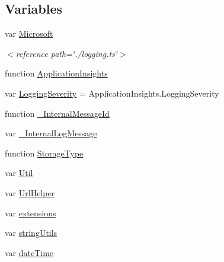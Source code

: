 \subsection*{Variables}
\begin{DoxyCompactItemize}
\item 
var \hyperlink{obj_2_release_2_package_2_package_tmp_2_scripts_2ai_80_822_89-build00167_8js_af7b21097393c8dc2ece8949358ff0e27}{Microsoft}
\begin{DoxyCompactList}\small\item\em $<$reference path=\char`\"{}./logging.\+ts\char`\"{}$>$ \end{DoxyCompactList}\item 
function \hyperlink{obj_2_release_2_package_2_package_tmp_2_scripts_2ai_80_822_89-build00167_8js_aa415ef4f8cdd699689ef4b61db7656d8}{Application\+Insights}
\item 
var \hyperlink{obj_2_release_2_package_2_package_tmp_2_scripts_2ai_80_822_89-build00167_8js_a7c9dc87e469261dd3cdf56090107bebc}{Logging\+Severity} = Application\+Insights.\+Logging\+Severity
\item 
function \hyperlink{obj_2_release_2_package_2_package_tmp_2_scripts_2ai_80_822_89-build00167_8js_aa4ededc59642ec3e9597dfcf82b22e85}{\+\_\+\+Internal\+Message\+Id}
\item 
var \hyperlink{obj_2_release_2_package_2_package_tmp_2_scripts_2ai_80_822_89-build00167_8js_aa8db6bc3fe99dd546c9bb97c6c7e4cb8}{\+\_\+\+Internal\+Log\+Message}
\item 
function \hyperlink{obj_2_release_2_package_2_package_tmp_2_scripts_2ai_80_822_89-build00167_8js_a48773dc305f9a6b59e02732bccf539e9}{Storage\+Type}
\item 
var \hyperlink{obj_2_release_2_package_2_package_tmp_2_scripts_2ai_80_822_89-build00167_8js_adf40173670f3e2786a0ef699f8b1d965}{Util}
\item 
var \hyperlink{obj_2_release_2_package_2_package_tmp_2_scripts_2ai_80_822_89-build00167_8js_a472b4d284dd284842438e13abaf8e3a3}{Url\+Helper}
\item 
var \hyperlink{obj_2_release_2_package_2_package_tmp_2_scripts_2ai_80_822_89-build00167_8js_a9ce4e17b92e5debce1c72727f3bdd551}{extensions}
\item 
var \hyperlink{obj_2_release_2_package_2_package_tmp_2_scripts_2ai_80_822_89-build00167_8js_a89651b896296468ad2af0726858df446}{string\+Utils}
\item 
var \hyperlink{obj_2_release_2_package_2_package_tmp_2_scripts_2ai_80_822_89-build00167_8js_afd39fa7d65e0546040b5b0efd5247ada}{date\+Time}

\end{DoxyCompactItemize}
